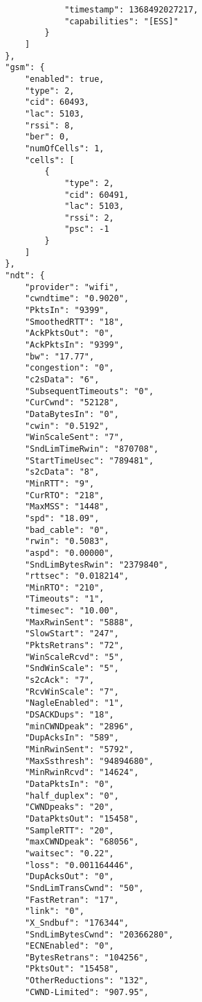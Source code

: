 \begin{verbatim}
                    "timestamp": 1368492027217,
                    "capabilities": "[ESS]"
                }
            ]
        },
        "gsm": {
            "enabled": true,
            "type": 2,
            "cid": 60493,
            "lac": 5103,
            "rssi": 8,
            "ber": 0,
            "numOfCells": 1,
            "cells": [
                {
                    "type": 2,
                    "cid": 60491,
                    "lac": 5103,
                    "rssi": 2,
                    "psc": -1
                }
            ]
        },
        "ndt": {
            "provider": "wifi",
            "cwndtime": "0.9020",
            "PktsIn": "9399",
            "SmoothedRTT": "18",
            "AckPktsOut": "0",
            "AckPktsIn": "9399",
            "bw": "17.77",
            "congestion": "0",
            "c2sData": "6",
            "SubsequentTimeouts": "0",
            "CurCwnd": "52128",
            "DataBytesIn": "0",
            "cwin": "0.5192",
            "WinScaleSent": "7",
            "SndLimTimeRwin": "870708",
            "StartTimeUsec": "789481",
            "s2cData": "8",
            "MinRTT": "9",
            "CurRTO": "218",
            "MaxMSS": "1448",
            "spd": "18.09",
            "bad_cable": "0",
            "rwin": "0.5083",
            "aspd": "0.00000",
            "SndLimBytesRwin": "2379840",
            "rttsec": "0.018214",
            "MinRTO": "210",
            "Timeouts": "1",
            "timesec": "10.00",
            "MaxRwinSent": "5888",
            "SlowStart": "247",
            "PktsRetrans": "72",
            "WinScaleRcvd": "5",
            "SndWinScale": "5",
            "s2cAck": "7",
            "RcvWinScale": "7",
            "NagleEnabled": "1",
            "DSACKDups": "18",
            "minCWNDpeak": "2896",
            "DupAcksIn": "589",
            "MinRwinSent": "5792",
            "MaxSsthresh": "94894680",
            "MinRwinRcvd": "14624",
            "DataPktsIn": "0",
            "half_duplex": "0",
            "CWNDpeaks": "20",
            "DataPktsOut": "15458",
            "SampleRTT": "20",
            "maxCWNDpeak": "68056",
            "waitsec": "0.22",
            "loss": "0.001164446",
            "DupAcksOut": "0",
            "SndLimTransCwnd": "50",
            "FastRetran": "17",
            "link": "0",
            "X_Sndbuf": "176344",
            "SndLimBytesCwnd": "20366280",
            "ECNEnabled": "0",
            "BytesRetrans": "104256",
            "PktsOut": "15458",
            "OtherReductions": "132",
            "CWND-Limited": "907.95",

\end{verbatim}
